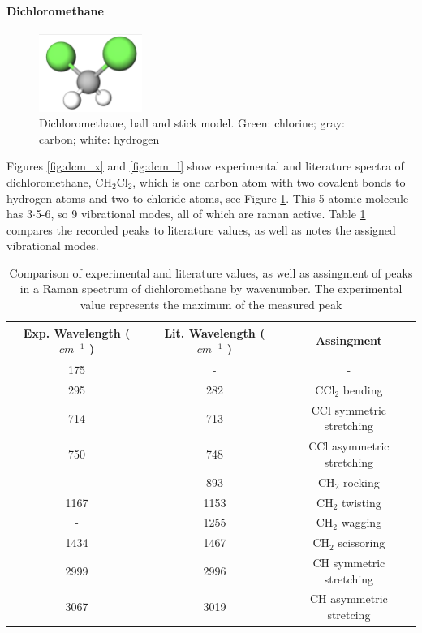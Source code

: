 \paragraph{Dichloromethane}

\begin{figure} %
    \centering
    \vspace{-20pt}
    \includegraphics[width=0.3\textwidth]{images/raman_spectra/dcm_i.png}
    \caption{Dichloromethane, ball and stick model. Green: chlorine; gray: carbon; white: hydrogen}
    \label{fig:dcm_i}
\end{figure}


    Figures \ref{fig:dcm_x} and \ref{fig:dcm_l} show experimental and literature spectra of dichloromethane, CH\(_2\)Cl\(_2\), which is one carbon atom with two covalent bonds to hydrogen atoms and two to chloride atoms, see Figure \ref{fig:dcm_i}. This 5-atomic molecule has 3\(\cdot\)5-6, so 9 vibrational modes, all of which are raman active. Table \ref{table:dcm} compares the recorded peaks to literature values, as well as notes the assigned vibrational modes. 

    \begin{table}[h]
    \begin{center}
        \vspace{10pt}
        \begin{tabular}{|c|c|c|}
         \hline
         Exp. Wavelength (\( cm^{-1} \) ) & Lit. Wavelength  (\( cm^{-1} \) ) & Assingment  \\ 
         \hline
         175 & - & - \\
         295 & 282 & CCl\(_2\) bending \\ 
         714 & 713 & CCl symmetric stretching\\
         750 & 748 & CCl asymmetric stretching\\
         - & 893 & CH\(_2\) rocking \\
         1167 & 1153 & CH\(_2\) twisting\\
         - & 1255 & CH\(_2\) wagging\\
         1434 & 1467 & CH\(_2\)  scissoring\\
         2999 & 2996 & CH symmetric stretching \\
         3067 & 3019 & CH asymmetric stretcing \\
         \hline
        \end{tabular}
        \caption{Comparison of experimental and literature \cite{dcml} values, as well as assingment of peaks in a Raman spectrum of dichloromethane by wavenumber. The experimental value represents the maximum of the measured peak }
        \label{table:dcm}
        \vspace{-15pt}
    \end{center}
    \end{table}


